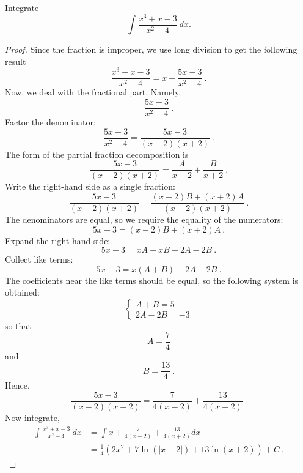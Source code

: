 \documentclass[compacto,10pt,comentarios]{aleph-notas}
\begin{document}
\begin{ejer}
    Integrate
    $$
        \int \frac{x^3+x-3}{x^2 - 4} ~ dx.
    $$
\end{ejer}
\begin{proof}
    Since the fraction is improper, we use long division to get the following result
    $$
        \frac{x^{3} + x - 3}{x^{2} - 4}=x+\frac{5 x - 3}{x^{2} - 4} ~ .
    $$
    Now, we deal with the fractional part. Namely,
    $$
        \frac{5 x - 3}{x^{2} - 4} ~ .
    $$
    Factor the denominator:
    $$
        \frac{5 x - 3}{x^{2} - 4}=\frac{5 x - 3}{\left(x - 2\right) \left(x + 2\right)} ~ .
    $$
    The form of the partial fraction decomposition is
    $$
        \frac{5 x - 3}{\left(x - 2\right) \left(x + 2\right)}=\frac{A}{x - 2}+\frac{B}{x + 2} ~ .
    $$
    Write the right-hand side as a single fraction:
    $$
        \frac{5 x - 3}{\left(x - 2\right) \left(x + 2\right)}=\frac{\left(x - 2\right) B + \left(x + 2\right) A}{\left(x - 2\right) \left(x + 2\right)} ~ .
    $$
    The denominators are equal, so we require the equality of the numerators:
    $$
        5 x - 3=\left(x - 2\right) B + \left(x + 2\right) A ~ .
    $$
    Expand the right-hand side:
    $$
        5 x - 3=x A + x B + 2 A - 2 B ~ .
    $$
    Collect like terms:
    $$
        5 x - 3=x \left(A + B\right) + 2 A - 2 B ~ .
    $$
    The coefficients near the like terms should be equal, so the following system is obtained:
    $$
        \begin{cases} A + B = 5\\2 A - 2 B = -3 \end{cases}
    $$
    so that
    $$
    A = \frac{7}{4}
    $$
    and
    $$
    B = \frac{13}{4} ~ .
    $$
    Hence,
    $$
        \frac{5 x - 3}{\left(x - 2\right) \left(x + 2\right)}=\frac{7}{4(x - 2)}+\frac{13}{4(x + 2)} ~ .
    $$
    Now integrate,
    \begin{align*}
        \int \frac{x^3+x-3}{x^2 - 4} ~ dx
        & = \int x + \frac{7}{4(x - 2)}+\frac{13}{4(x + 2)} dx \\
        & = \frac{1}{4} \left( 2x^{2} + 7 \ln(|x-2|) + 13 \ln(x + 2) \right) + C ~ .
    \end{align*}
\end{proof}
\end{document}
